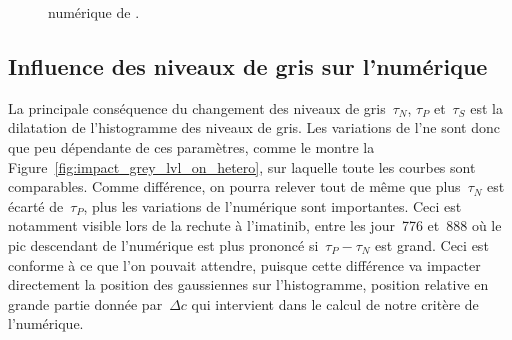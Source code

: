 \documentclass[main.tex]{subfiles}
\begin{document}
\begin{figure}
\centering
{}
\caption{\label{fig:baisse_hetero_fin_simu} \Hetero numérique de \Nber. }
\end{figure}


\subsection{Influence des niveaux de gris sur l'\hetero numérique}
La principale conséquence du changement des niveaux de gris~$\tau_N$, $\tau_P$ et~$\tau_S$ est la dilatation de l'histogramme des niveaux de gris. Les variations de l'\hetero ne sont donc que peu dépendante de ces paramètres, comme le montre 
la Figure~\ref{fig:impact_grey_lvl_on_hetero}, sur laquelle toute les courbes sont comparables. Comme différence, on pourra relever tout de même que plus~$\tau_N$ est écarté de~$\tau_P$, plus les variations de l'\hetero numérique sont importantes. Ceci est notamment visible lors de la rechute à l'imatinib, entre les jour~776 et~888 où le pic descendant de l'\hetero numérique est plus prononcé si~$\tau_P-\tau_N$ est grand. Ceci est conforme à ce que l'on pouvait attendre, puisque cette différence va impacter directement la position des gaussiennes sur l'histogramme, position relative en grande partie donnée par~$\Delta c$ qui intervient dans le calcul de notre critère de l'\hetero numérique.
\end{document}
